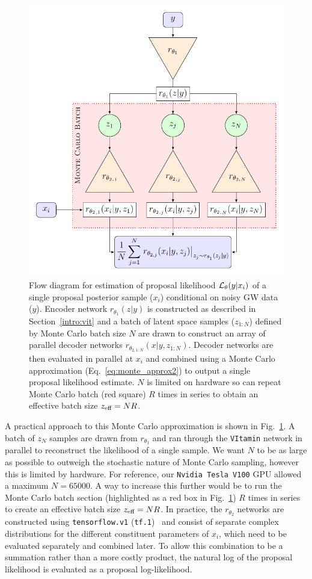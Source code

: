 \documentclass[a4paper]{jpconf}
\begin{document}
\begin{figure}
	\centering
	\includegraphics[width=.75\linewidth]{figs/tikz_monte.pdf}
	\caption{Flow diagram for estimation of proposal likelihood ${\cal L}_\theta(y|x_i)$ of a single proposal posterior sample ($x_i$) conditional on noisy GW data ($y$). Encoder network $r_{\theta_1}(z|y)$ is constructed as described in Section~\ref{intro:vit} and a batch of latent space samples ($z_{1:N}$) defined by Monte Carlo batch size $N$ are drawn to construct an array of parallel decoder networks $r_{\theta_{2,1:N}}(x|y,z_{1:N})$. Decoder networks are then evaluated in parallel at $x_i$ and combined using a Monte Carlo approximation (Eq.~\ref{eq:monte_approx2}) to output a single proposal likelihood estimate. $N$ is limited on hardware so can repeat Monte Carlo batch (red square) $R$ times in series to obtain an effective batch size $z_\textup{eff}=NR$.}
	\label{fig:monte_flow}
\end{figure}

A practical approach to this Monte Carlo approximation is shown in Fig.~\ref{fig:monte_flow}. A batch of $z_N$ samples are drawn from $r_{\theta_1}$ and ran through the \texttt{VItamin} network in parallel to reconstruct the likelihood of a single sample. We want $N$ to be as large as possible to outweigh the stochastic nature of Monte Carlo sampling, however this is limited by hardware. For reference, our \texttt{Nvidia Tesla V100} GPU allowed a maximum $N=65000$. A way to increase this further would be to run the Monte Carlo batch section (highlighted as a red box in Fig.~\ref{fig:monte_flow}) $R$ times in series to create an effective batch size $z_\textup{eff}=NR$. In practice, the $r_{\theta_2}$ networks are constructed using \texttt{tensorflow.v1}  (\texttt{tf.1})~\cite{tensorflow} and consist of separate complex distributions for the different constituent parameters of $x_i$, which need to be evaluated separately and combined later. To allow this combination to be a summation rather than a more costly product, the natural log of the proposal likelihood is evaluated as a proposal log-likelihood. 
\end{document}
